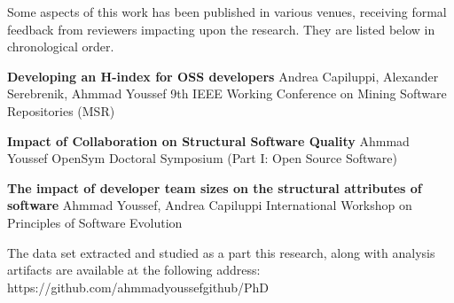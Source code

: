 
\begin{publications}

Some aspects of this work has been published in various venues, receiving formal feedback  from  reviewers  impacting  upon  the  research. They are listed below in chronological order.

\textbf{Developing an H-index for OSS developers}\newline
Andrea Capiluppi, Alexander Serebrenik, Ahmmad Youssef 9th IEEE Working Conference on Mining Software Repositories (MSR)

\textbf{Impact of Collaboration on Structural Software Quality}\newline
Ahmmad Youssef OpenSym Doctoral Symposium (Part I: Open Source Software)

\textbf{The impact of developer team sizes on the structural attributes of software}\newline
Ahmmad Youssef, Andrea Capiluppi International Workshop on Principles of Software Evolution

The data set extracted and studied as a part this research, along with analysis artifacts are available at the following address: https://github.com/ahmmadyoussefgithub/PhD
\end{publications}
